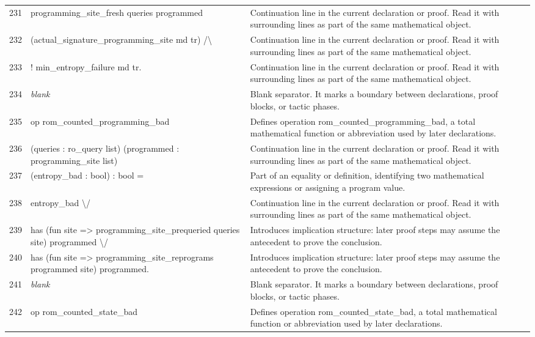 \documentclass[10pt]{article}
\begin{document}
\begin{longtable}{r L{0.53\textwidth} L{0.37\textwidth}}
231 & {\ttfamily\scriptsize   programming\_site\_fresh queries programmed} & Continuation line in the current declaration or proof.  Read it with surrounding lines as part of the same mathematical object. \\
232 & {\ttfamily\scriptsize     (actual\_signature\_programming\_site md tr) /\textbackslash{}} & Continuation line in the current declaration or proof.  Read it with surrounding lines as part of the same mathematical object. \\
233 & {\ttfamily\scriptsize   ! min\_entropy\_failure md tr.} & Continuation line in the current declaration or proof.  Read it with surrounding lines as part of the same mathematical object. \\
234 & {\ttfamily\scriptsize \emph{blank}} & Blank separator.  It marks a boundary between declarations, proof blocks, or tactic phases. \\
235 & {\ttfamily\scriptsize op rom\_counted\_programming\_bad} & Defines operation rom\_counted\_programming\_bad, a total mathematical function or abbreviation used by later declarations. \\
236 & {\ttfamily\scriptsize    (queries : ro\_query list) (programmed : programming\_site list)} & Continuation line in the current declaration or proof.  Read it with surrounding lines as part of the same mathematical object. \\
237 & {\ttfamily\scriptsize    (entropy\_bad : bool) : bool =} & Part of an equality or definition, identifying two mathematical expressions or assigning a program value. \\
238 & {\ttfamily\scriptsize   entropy\_bad \textbackslash{}/} & Continuation line in the current declaration or proof.  Read it with surrounding lines as part of the same mathematical object. \\
239 & {\ttfamily\scriptsize   has (fun site => programming\_site\_prequeried queries site) programmed \textbackslash{}/} & Introduces implication structure: later proof steps may assume the antecedent to prove the conclusion. \\
240 & {\ttfamily\scriptsize   has (fun site => programming\_site\_reprograms programmed site) programmed.} & Introduces implication structure: later proof steps may assume the antecedent to prove the conclusion. \\
241 & {\ttfamily\scriptsize \emph{blank}} & Blank separator.  It marks a boundary between declarations, proof blocks, or tactic phases. \\
242 & {\ttfamily\scriptsize op rom\_counted\_state\_bad} & Defines operation rom\_counted\_state\_bad, a total mathematical function or abbreviation used by later declarations. \\

\end{longtable}
\end{document}
